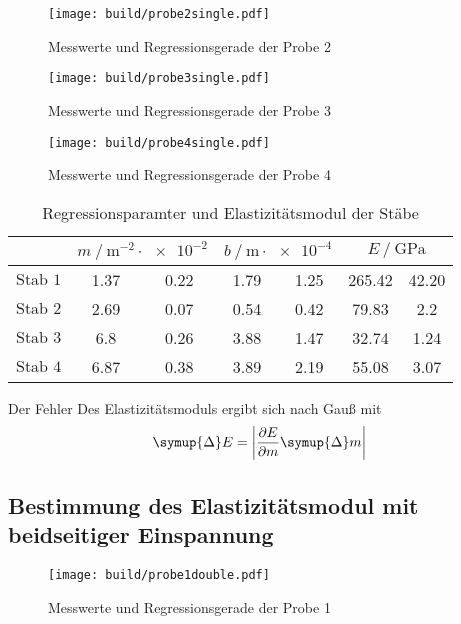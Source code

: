 \begin{figure}
  \centering
  \caption{Messwerte und Regressionsgerade der Probe 2}
  \label{fig:probe2single}
  \texttt{[image: build/probe2single.pdf]}
\end{figure}
\begin{figure}
  \centering
  \caption{Messwerte und Regressionsgerade der Probe 3}
  \label{fig:probe3single}
  \texttt{[image: build/probe3single.pdf]}
\end{figure}
\begin{figure}
  \centering
  \caption{Messwerte und Regressionsgerade der Probe 4}
  \label{fig:probe4single}
  \texttt{[image: build/probe4single.pdf]}
\end{figure}
\begin{table}
  \centering
  \caption{Regressionsparamter und Elastizitätsmodul der Stäbe}
  \label{tab:regression}
  \begin{tabular} {S[table-format=3.0] 
    S[table-format=1.2] @{${}\pm{}$} S[table-format=1.2]
    S[table-format=1.2] @{${}\pm{}$} S[table-format=1.2] 
    S[table-format=3.2] @{${}\pm{}$} S[table-format=2.2]}
  \toprule
  &  & 
     & 
    \\
  \midrule
  {$\text{Stab 1}$}  & 1.37 & 0.22 & 1.79 & 1.25 & 265.42 & 42.20\\
  {$\text{Stab 2}$}  & 2.69 & 0.07 & 0.54 & 0.42 & 79.83  & 2.2  \\
  {$\text{Stab 3}$}  & 6.8  & 0.26 & 3.88 & 1.47 & 32.74  & 1.24 \\ 
  {$\text{Stab 4}$}  & 6.87 & 0.38 & 3.89 & 2.19 & 55.08  & 3.07 \\
  \bottomrule
  \end{tabular}
\end{table}
Der Fehler Des Elastizitätsmoduls ergibt sich nach Gauß mit
\begin{equation*}
  \symup{\Delta} E = \left | \frac{\partial E}{\partial m}  \symup{\Delta} m \right |
\end{equation*}
\FloatBarrier
\subsection{Bestimmung des Elastizitätsmodul mit beidseitiger Einspannung}
\begin{figure}
  \centering
  \texttt{[image: build/probe1double.pdf]}
  \caption{Messwerte und Regressionsgerade der Probe 1}
  \label{fig:probe1double}
\end{figure}